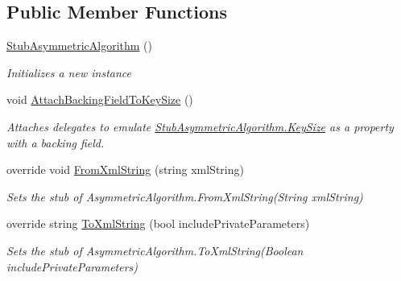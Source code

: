 \subsection*{Public Member Functions}
\begin{DoxyCompactItemize}
\item 
\hyperlink{class_system_1_1_security_1_1_cryptography_1_1_fakes_1_1_stub_asymmetric_algorithm_af007bd825bfffcee601238508e861d45}{Stub\-Asymmetric\-Algorithm} ()
\begin{DoxyCompactList}\small\item\em Initializes a new instance\end{DoxyCompactList}\item 
void \hyperlink{class_system_1_1_security_1_1_cryptography_1_1_fakes_1_1_stub_asymmetric_algorithm_a56b290862a4806d9f55a5db2b5752f5d}{Attach\-Backing\-Field\-To\-Key\-Size} ()
\begin{DoxyCompactList}\small\item\em Attaches delegates to emulate \hyperlink{class_system_1_1_security_1_1_cryptography_1_1_fakes_1_1_stub_asymmetric_algorithm_a2a0f8487078ea7280b8284658e71d28b}{Stub\-Asymmetric\-Algorithm.\-Key\-Size} as a property with a backing field.\end{DoxyCompactList}\item 
override void \hyperlink{class_system_1_1_security_1_1_cryptography_1_1_fakes_1_1_stub_asymmetric_algorithm_a3d5f5e1da5b0dad3357cf0f7f1144cfa}{From\-Xml\-String} (string xml\-String)
\begin{DoxyCompactList}\small\item\em Sets the stub of Asymmetric\-Algorithm.\-From\-Xml\-String(\-String xml\-String)\end{DoxyCompactList}\item 
override string \hyperlink{class_system_1_1_security_1_1_cryptography_1_1_fakes_1_1_stub_asymmetric_algorithm_a381730c4a560fb0bd40fbe1c2266b2cb}{To\-Xml\-String} (bool include\-Private\-Parameters)
\begin{DoxyCompactList}\small\item\em Sets the stub of Asymmetric\-Algorithm.\-To\-Xml\-String(\-Boolean include\-Private\-Parameters)\end{DoxyCompactList}\end{DoxyCompactItemize}
